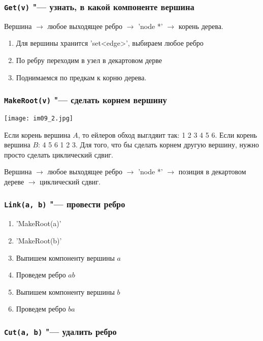 \subsubsection{\texttt{Get(v)} "--- узнать, в какой компоненте вершина}

Вершина $\to$ любое выходящее ребро $\to$ \cpp'node *' $\to$ корень дерева.
\begin{enumerate}
	\item Для вершины хранится \cpp'set<edge>', выбираем любое ребро
	\item По ребру переходим в узел в декартовом дерве
	\item Поднимаемся по предкам к корню дерева.
\end{enumerate}

\subsubsection{\texttt{MakeRoot(v)} "--- сделать корнем вершину}

\begin{center}
\texttt{[image: im09\_2.jpg]}
\end{center}

Если корень вершина $A$, то ейлеров обход выглдяит так: 1 2 3 4 5 6.
Если корень вершина $B$: 4 5 6 1 2 3.
Для того, что бы сделать корнем другую вершину, нужно просто сделать циклический сдвиг.

Вершина $\to$ любое выходящее ребро $\to$ \cpp'node *' $\to$ позиция в декартовом дереве $\to$ циклический сдвиг.

\subsubsection{\texttt{Link(a, b)} "--- провести ребро}

\begin{enumerate}
	\item \cpp'MakeRoot(a)'
	\item \cpp'MakeRoot(b)'
	\item Выпишем компоненту вершины $a$
	\item Проведем ребро $ab$
	\item Выпишем компоненту вершины $b$
	\item Проведем ребро $ba$
\end{enumerate}

\subsubsection{\texttt{Cut(a, b)} "--- удалить ребро}

